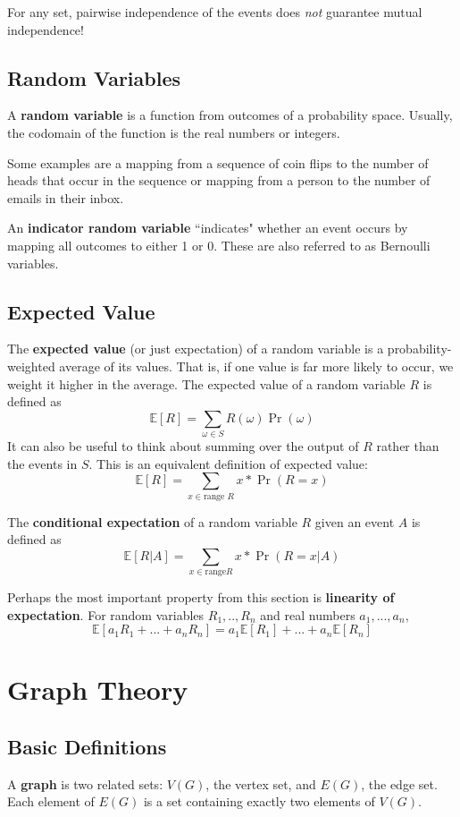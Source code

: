 \documentclass[12pt,letterpaper]{article}
\begin{document}
For any set, pairwise independence of the events does \textit{not} guarantee mutual independence!

\subsection{Random Variables}

A \textbf{random variable} is a function from outcomes of a probability space. Usually, the codomain of the function is the real numbers or integers.

Some examples are a mapping from a sequence of coin flips to the number of heads that occur in the sequence or mapping from a person to the number of emails in their inbox.

An \textbf{indicator random variable} ``indicates" whether an event occurs by mapping all outcomes to either 1 or 0. These are also referred to as Bernoulli variables.

\subsection{Expected Value}

The \textbf{expected value} (or just expectation) of a random variable is a probability-weighted average of its values. That is, if one value is far more likely to occur, we weight it higher in the average. The expected value of a random variable $R$ is defined as
$$\mathbb{E}[R]= \sum_{\omega \in S} R(\omega)\Pr(\omega)$$
It can also be useful to think about summing over the output of $R$ rather than the events in $S$. This is an equivalent definition of expected value:
$$\mathbb{E}[R]= \sum_{x \in \text{range } R} x * \Pr(R = x)$$

The \textbf{conditional expectation} of a random variable $R$ given an event $A$ is defined as $$\mathbb{E}[R|A]=\sum_{x \in \text{range} R} x * \Pr(R = x | A)$$

Perhaps the most important property from this section is \textbf{linearity of expectation}. For random variables $R_1,..,R_n$ and real numbers $a_1,...,a_n$, $$\mathbb{E}[a_1R_1+...+a_nR_n]=a_1\mathbb{E}[R_1]+...+a_n\mathbb{E}[R_n]$$

\section{Graph Theory}

\subsection{Basic Definitions}
A \textbf{graph} is two related sets: $V(G)$, the vertex set, and $E(G)$, the edge set. Each element of $E(G)$ is a set containing exactly two elements of $V(G)$.
\end{document}
